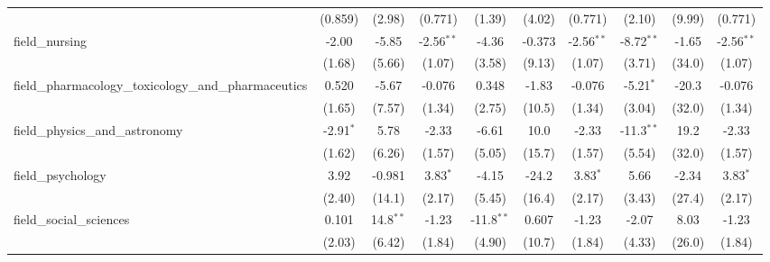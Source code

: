 \begin{tabular}{lccccccccc}
                                                               & (0.859)       & (2.98)         & (0.771)       & (1.39)        & (4.02)        & (0.771)       & (2.10)        & (9.99)         & (0.771)\\   
   field\_nursing                                              & -2.00         & -5.85          & -2.56$^{**}$  & -4.36         & -0.373        & -2.56$^{**}$  & -8.72$^{**}$  & -1.65          & -2.56$^{**}$\\   
                                                               & (1.68)        & (5.66)         & (1.07)        & (3.58)        & (9.13)        & (1.07)        & (3.71)        & (34.0)         & (1.07)\\   
   field\_pharmacology\_toxicology\_and\_pharmaceutics         & 0.520         & -5.67          & -0.076        & 0.348         & -1.83         & -0.076        & -5.21$^{*}$   & -20.3          & -0.076\\   
                                                               & (1.65)        & (7.57)         & (1.34)        & (2.75)        & (10.5)        & (1.34)        & (3.04)        & (32.0)         & (1.34)\\   
   field\_physics\_and\_astronomy                              & -2.91$^{*}$   & 5.78           & -2.33         & -6.61         & 10.0          & -2.33         & -11.3$^{**}$  & 19.2           & -2.33\\   
                                                               & (1.62)        & (6.26)         & (1.57)        & (5.05)        & (15.7)        & (1.57)        & (5.54)        & (32.0)         & (1.57)\\   
   field\_psychology                                           & 3.92          & -0.981         & 3.83$^{*}$    & -4.15         & -24.2         & 3.83$^{*}$    & 5.66          & -2.34          & 3.83$^{*}$\\   
                                                               & (2.40)        & (14.1)         & (2.17)        & (5.45)        & (16.4)        & (2.17)        & (3.43)        & (27.4)         & (2.17)\\   
   field\_social\_sciences                                     & 0.101         & 14.8$^{**}$    & -1.23         & -11.8$^{**}$  & 0.607         & -1.23         & -2.07         & 8.03           & -1.23\\   
                                                               & (2.03)        & (6.42)         & (1.84)        & (4.90)        & (10.7)        & (1.84)        & (4.33)        & (26.0)         & (1.84)\\   

\end{tabular}
